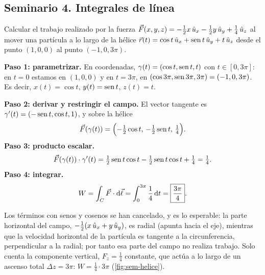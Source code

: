 \subsection{Seminario 4. Integrales de línea}\label{sem:linea}
\begin{ejercicio}\label{ejer:helice}
Calcular el trabajo realizado por la fuerza
$\vec{F}(x,y,z)=-\tfrac12x\,\hat{u}_{x}-\tfrac12y\,\hat{u}_{y}+\tfrac14\,\hat{u}_{z}$ al mover una partícula a
lo largo de la hélice $\vec{r}(t)=\cos t\,\hat{u}_{x}+\operatorname{sen} t\,\hat{u}_{y}+t\,\hat{u}_{z}$ desde el punto
$(1,0,0)$ al punto $(-1,0,3\pi)$.
\end{ejercicio}
\begin{resolucion}
\textbf{Paso 1: parametrizar.} En coordenadas, $\gamma(t)=(\cos t,\operatorname{sen} t,t)$ con
$t\in[0,3\pi]$: en $t=0$ estamos en $(1,0,0)$ y en $t=3\pi$, en
$(\cos3\pi,\operatorname{sen}3\pi,3\pi)=(-1,0,3\pi)$. Es decir,
$x(t)=\cos t$, $y(t)=\operatorname{sen} t$, $z(t)=t$.

\textbf{Paso 2: derivar y restringir el campo.} El vector tangente es
$\gamma'(t)=(-\operatorname{sen} t,\cos t,1)$, y sobre la hélice
\[
  \vec{F}(\gamma(t))=\Bigl(-\tfrac12\cos t,\,-\tfrac12\operatorname{sen} t,\,\tfrac14\Bigr).
\]
\textbf{Paso 3: producto escalar.}
\[
  \vec{F}(\gamma(t))\cdot\gamma'(t)=\tfrac12\operatorname{sen} t\cos t-\tfrac12\operatorname{sen} t\cos t+\tfrac14=\tfrac14 .
\]
\textbf{Paso 4: integrar.}
\[
  W=\int_{C}\vec{F}\cdot\mathrm{d}\vec{\ell}=\int_{0}^{3\pi}\frac14\,\mathrm{d} t=\boxed{\frac{3\pi}{4}} .
\]
\end{resolucion}

\begin{observacion}
Los términos con senos y cosenos se han cancelado, y es lo esperable: la parte
horizontal del campo, $-\tfrac12(x\,\hat{u}_{x}+y\,\hat{u}_{y})$, es radial (apunta hacia el eje),
mientras que la velocidad horizontal de la partícula es tangente a la
circunferencia, perpendicular a la radial; por tanto esa parte del campo no
realiza trabajo. Solo cuenta la componente vertical, $F_z=\tfrac14$ constante,
que actúa a lo largo de un ascenso total $\Delta z=3\pi$:
$W=\tfrac14\cdot3\pi$ (\cref{fig:sem-helice}).
\end{observacion}


